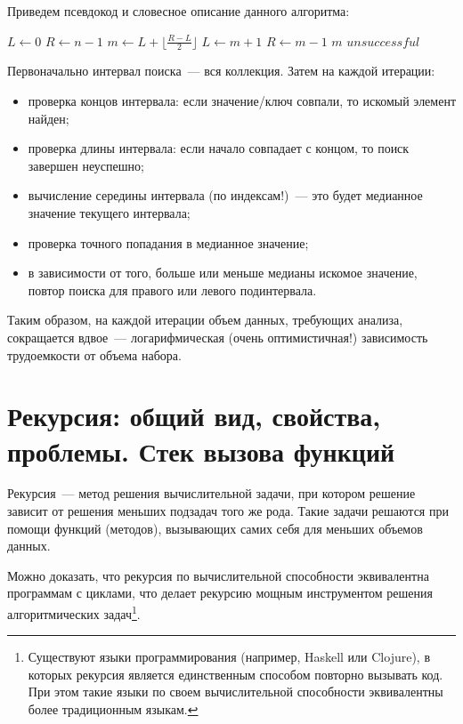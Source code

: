 Приведем псевдокод и словесное описание данного алгоритма:
\begin{algorithmic}
  \State $L \gets 0$
  \State $R \gets n - 1$
  \State $m \gets L + \lfloor\frac{R - L}{2}\rfloor$
  \State $L \gets m + 1$
  \State $R \gets m - 1$
  \Else
  \State \Return $m$
  \EndIf
  \EndWhile
  \State \Return $unsuccessful$
  \EndFunction
\end{algorithmic}

\bigbreak

Первоначально интервал поиска~--- вся коллекция.
Затем на каждой итерации:
\begin{itemize}
  \item проверка концов интервала: если значение/ключ совпали, то
        искомый элемент найден;
  \item проверка длины интервала: если начало совпадает с концом, то
        поиск завершен неуспешно;
  \item вычисление середины интервала (по индексам!)~--- это будет
        медианное значение текущего интервала;
  \item проверка точного попадания в медианное значение;
  \item в зависимости от того, больше или меньше медианы искомое
        значение, повтор поиска для правого или левого подинтервала.
\end{itemize}

Таким образом, на каждой итерации объем данных, требующих анализа, сокращается вдвое~---
логарифмическая (очень оптимистичная!) зависимость трудоемкости от объема набора.

%
%

\section{Рекурсия: общий вид, свойства, проблемы. Стек вызова функций}
Рекурсия~--- метод решения вычислительной задачи, при котором решение зависит от решения меньших подзадач того же рода. Такие задачи решаются
при помощи функций (методов), вызывающих самих себя для меньших объемов данных.

Можно доказать, что рекурсия по вычислительной способности эквивалентна программам с циклами, что делает
рекурсию мощным инструментом решения алгоритмических задач\footnote{Существуют языки программирования (например, Haskell или Clojure),
  в которых рекурсия является единственным способом повторно вызывать код. При этом такие языки по своем вычислительной
  способности эквивалентны более традиционным языкам.}.

